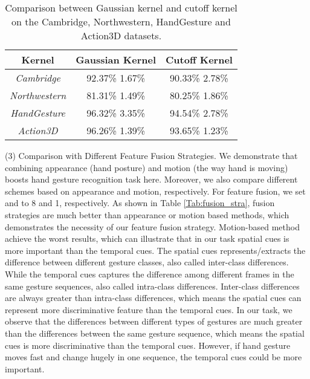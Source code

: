 \documentclass[5p]{elsarticle}
\begin{document}
\begin{table}[!htbp]
	\centering
	\caption{Comparison between Gaussian kernel and cutoff kernel on the Cambridge, Northwestern, HandGesture and Action3D datasets.}
	\begin{tabular}{c|c|c} \hline
		Kernel                          & Gaussian Kernel          & Cutoff Kernel\\ \hline
		\emph{Cambridge}       & 92.37\%  1.67\% & 90.33\%  2.78\%   \\ \hline
		\emph{Northwestern}  & 81.31\%  1.49\%  & 80.25\%  1.86\%   \\ \hline
		\emph{HandGesture}   & 96.32\%  3.35\% & 94.54\%  2.78\%    \\ \hline
		\emph{Action3D}         & 96.26\%  1.39\% & 93.65\%  1.23\%   \\ \hline
	\end{tabular}
	\label{Tab:kernel}
\end{table}

\noindent (3) Comparison with Different Feature Fusion Strategies.
We demonstrate that combining appearance (hand posture) and motion (the way hand is moving) boosts hand gesture recognition task here.
Moreover, we also compare different schemes based on appearance and motion, respectively.
For feature fusion, we set  and  to 8 and 1, respectively.
As shown in Table \ref{Tab:fusion_stra}, fusion strategies are much better than appearance or motion based methods, which demonstrates the necessity of our feature fusion strategy.
Motion-based method achieve the worst results, which can illustrate that in our task spatial cues is more important than the temporal cues.
The spatial cues represents/extracts the difference between different gesture classes, also called inter-class differences.
While the temporal cues captures the difference among different frames in the same gesture sequences, also called intra-class differences.
Inter-class differences are always greater than intra-class differences, which means the spatial cues can represent more discriminative feature than the temporal cues.
In our task, we observe that the differences between different types of gestures are much greater than the differences between the same gesture sequence, which means the spatial cues is more discriminative than the temporal cues.
However, if hand gesture moves fast and change hugely in one sequence, the temporal cues could be more important.
\end{document}
